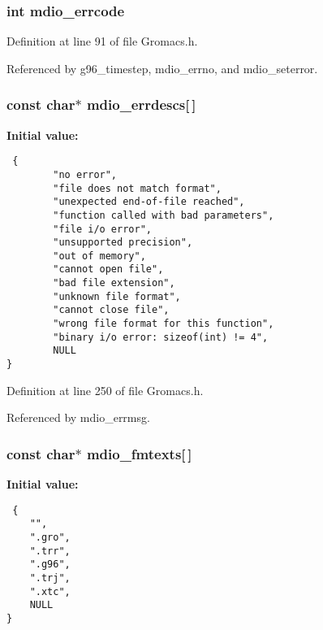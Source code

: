 \subsubsection{\setlength{\rightskip}{0pt plus 5cm}int mdio\_\-errcode\hspace{0.3cm}{\tt  [static]}}\label{Gromacs_8h_a33}




Definition at line 91 of file Gromacs.h.

Referenced by g96\_\-timestep, mdio\_\-errno, and mdio\_\-seterror.
\subsubsection{\setlength{\rightskip}{0pt plus 5cm}const char$\ast$ mdio\_\-errdescs[$\,$]\hspace{0.3cm}{\tt  [static]}}\label{Gromacs_8h_a34}


{\bf Initial value:}

\footnotesize\begin{verbatim} {
        "no error",
        "file does not match format",
        "unexpected end-of-file reached",
        "function called with bad parameters",
        "file i/o error",
        "unsupported precision",
        "out of memory",
        "cannot open file",
        "bad file extension",
        "unknown file format",
        "cannot close file",
        "wrong file format for this function",
        "binary i/o error: sizeof(int) != 4",
        NULL
}\end{verbatim}\normalsize 


Definition at line 250 of file Gromacs.h.

Referenced by mdio\_\-errmsg.
\subsubsection{\setlength{\rightskip}{0pt plus 5cm}const char$\ast$ mdio\_\-fmtexts[$\,$]}\label{Gromacs_8h_a32}


{\bf Initial value:}

\footnotesize\begin{verbatim} {
    "",
    ".gro",
    ".trr",
    ".g96",
    ".trj",
    ".xtc",
    NULL
}\end{verbatim}\normalsize 


